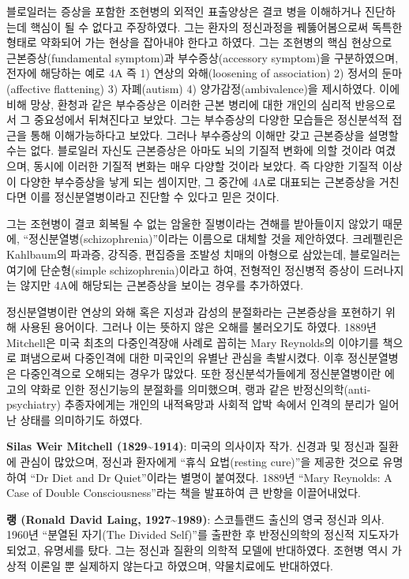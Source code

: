 \documentclass[
]{article}
\begin{document}
블로일러는 증상을 포함한 조현병의 외적인 표출양상은 결코 병을 이해하거나
진단하는데 핵심이 될 수 없다고 주장하였다. 그는 환자의 정신과정을
꿰뚫어봄으로써 독특한 형태로 약화되어 가는 현상을 잡아내야 한다고
하였다. 그는 조현병의 핵심 현상으로 근본증상(fundamental symptom)과
부수증상(accessory symptom)을 구분하였으며, 전자에 해당하는 예로 4A 즉
1) 연상의 와해(loosening of association) 2) 정서의 둔마(affective
flattening) 3) 자폐(autism) 4) 양가감정(ambivalence)을 제시하였다. 이에
비해 망상, 환청과 같은 부수증상은 이러한 근본 병리에 대한 개인의 심리적
반응으로서 그 중요성에서 뒤쳐진다고 보았다. 그는 부수증상의 다양한
모습들은 정신분석적 접근을 통해 이해가능하다고 보았다. 그러나 부수증상의
이해만 갖고 근본증상을 설명할 수는 없다. 블로일러 자신도 근본증상은
아마도 뇌의 기질적 변화에 의할 것이라 여겼으며, 동시에 이러한 기질적
변화는 매우 다양할 것이라 보았다. 즉 다양한 기질적 이상이 다양한
부수증상을 낳게 되는 셈이지만, 그 중간에 4A로 대표되는 근본증상을
거친다면 이를 정신분열병이라고 진단할 수 있다고 믿은 것이다.

그는 조현병이 결코 회복될 수 없는 암울한 질병이라는 견해를 받아들이지
않았기 때문에, ``정신분열병(schizophrenia)''이라는 이름으로 대체할 것을
제안하였다. 크레펠린은 Kahlbaum의 파과증, 강직증, 편집증을 조발성 치매의
아형으로 삼았는데, 블로일러는 여기에 단순형(simple schizophrenia)이라고
하여, 전형적인 정신병적 증상이 드러나지는 않지만 4A에 해당되는
근본증상을 보이는 경우를 추가하였다.

정신분열병이란 연상의 와해 혹은 지성과 감성의 분절화라는 근본증상을
포현하기 위해 사용된 용어이다. 그러나 이는 뜻하지 않은 오해를 불러오기도
하였다. 1889년 Mitchell은 미국 최초의 다중인격장애 사례로 꼽히는 Mary
Reynolds의 이야기를 책으로 펴냄으로써 다중인격에 대한 미국인의 유별난
관심을 촉발시켰다. 이후 정신분열병은 다중인격으로 오해되는 경우가
많았다. 또한 정신분석가들에게 정신분열병이란 에고의 약화로 인한
정신기능의 분절화를 의미했으며, 랭과 같은 반정신의학(anti-psychiatry)
추종자에게는 개인의 내적욕망과 사회적 압박 속에서 인격의 분리가 일어난
상태를 의미하기도 하였다.

\textbf{Silas Weir Mitchell (1829\textasciitilde1914)}: 미국의 의사이자
작가. 신경과 및 정신과 질환에 관심이 많았으며, 정신과 환자에게 ``휴식
요법(resting cure)''을 제공한 것으로 유명하여 ``Dr Diet and Dr
Quiet''이라는 별명이 붙여졌다. 1889년 ``Mary Reynolds: A Case of Double
Consciousness''라는 책을 발표하여 큰 반향을 이끌어내었다.

\textbf{랭 (Ronald David Laing, 1927\textasciitilde1989)}: 스코틀랜드
출신의 영국 정신과 의사. 1960년 ``분열된 자기(The Divided Self)''를
출판한 후 반정신의학의 정신적 지도자가 되었고, 유명세를 탔다. 그는
정신과 질환의 의학적 모델에 반대하였다. 조현병 역시 가상적 이론일 뿐
실제하지 않는다고 하였으며, 약물치료에도 반대하였다.
\end{document}
